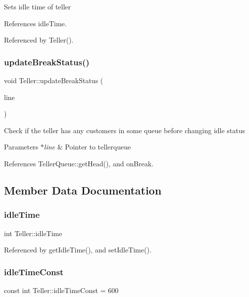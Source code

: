 Sets idle time of teller 

References idle\+Time.



Referenced by Teller().

\mbox{\label{classTeller_ac2631da9a56456deb4a91a1a78b3cd1e}} 
\subsubsection{update\+Break\+Status()}
{\footnotesize\ttfamily void Teller\+::update\+Break\+Status (\begin{DoxyParamCaption}\item[{\textbf{ Teller\+Queue} $\ast$}]{line }\end{DoxyParamCaption})}

Check if the teller has any customers in some queue before changing idle status 
\begin{DoxyParams}{Parameters}
{\em $\ast$line} & Pointer to tellerqueue \\
\hline
\end{DoxyParams}


References Teller\+Queue\+::get\+Head(), and on\+Break.



\subsection{Member Data Documentation}
\mbox{\label{classTeller_a09db98c5db957cd1937b3b5e9fa2820b}} 
\subsubsection{idle\+Time}
{\footnotesize\ttfamily int Teller\+::idle\+Time\hspace{0.3cm}{\ttfamily [private]}}



Referenced by get\+Idle\+Time(), and set\+Idle\+Time().

\mbox{\label{classTeller_ac2dc8cb04d87147182cc565b0dbb2804}} 
\subsubsection{idle\+Time\+Const}
{\footnotesize\ttfamily const int Teller\+::idle\+Time\+Const = 600\hspace{0.3cm}{\ttfamily [private]}}

